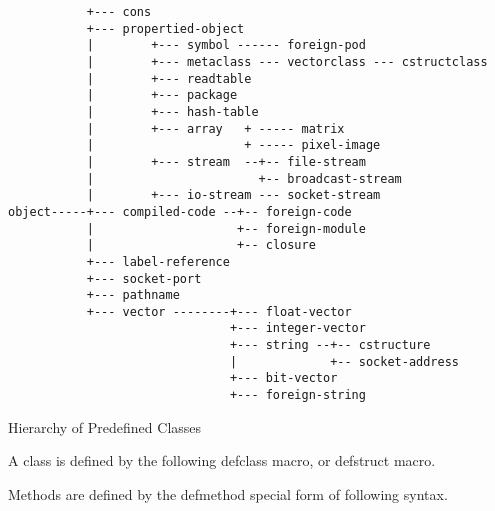 \begin{table}
\begin{verbatim}
           +--- cons
           +--- propertied-object
           |        +--- symbol ------ foreign-pod
           |        +--- metaclass --- vectorclass --- cstructclass
           |        +--- readtable
           |        +--- package
           |        +--- hash-table
           |        +--- array   + ----- matrix
           |                     + ----- pixel-image
           |        +--- stream  --+-- file-stream
           |                       +-- broadcast-stream
           |        +--- io-stream --- socket-stream
object-----+--- compiled-code --+-- foreign-code
           |                    +-- foreign-module
           |                    +-- closure
           +--- label-reference
           +--- socket-port
           +--- pathname
           +--- vector --------+--- float-vector
                               +--- integer-vector
                               +--- string --+-- cstructure
                               |             +-- socket-address
                               +--- bit-vector
                               +--- foreign-string
\end{verbatim}
\caption{\label{ClassHierarchy}Hierarchy of Predefined Classes}
\end{table}

A class is defined by the following defclass macro, or defstruct macro.


Methods are defined by the defmethod special form of following syntax.

